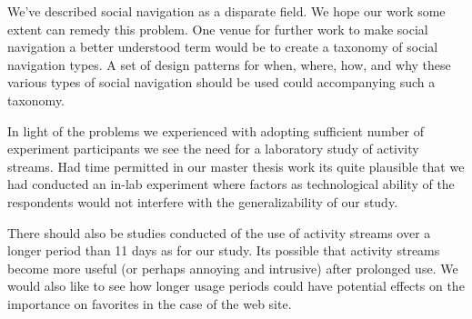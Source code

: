 We've described social navigation as a disparate field. We hope our work
some extent can remedy this problem. One venue for further work to make social
navigation a better understood term would be to create a taxonomy of social
navigation types. A set of design patterns for when, where, how, and why these
various types of social navigation should be used could accompanying such a
taxonomy.

\parabreak

In light of the problems we experienced with adopting sufficient number of
experiment participants we see the need for a laboratory study of activity
streams. Had time permitted in our master thesis work its quite plausible that
we had conducted an in-lab experiment where factors as technological ability
of the respondents would not interfere with the generalizability of our study.

There should also be studies conducted of the use of activity streams over a
longer period than 11 days as for our study. Its possible that activity
streams become more useful (or perhaps annoying and intrusive) after prolonged
use. We would also like to see how longer usage periods could have potential
effects on the importance on favorites in the case of the \urort{} web site.
